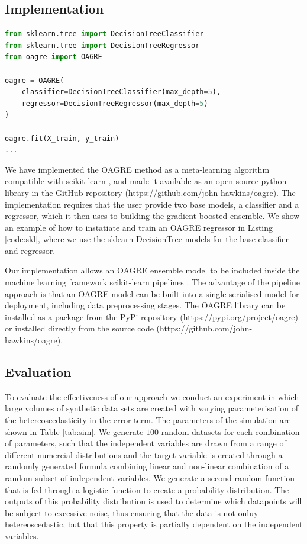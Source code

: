 \documentclass[graybox]{svmult}
\begin{document}
\subsection{Implementation}
 
\begin{lstlisting}[language=Python,label={code:skl}, caption=Usage of OAGRE with scikit-learn models ]
from sklearn.tree import DecisionTreeClassifier
from sklearn.tree import DecisionTreeRegressor
from oagre import OAGRE

oagre = OAGRE(
    classifier=DecisionTreeClassifier(max_depth=5),
    regressor=DecisionTreeRegressor(max_depth=5)
)

oagre.fit(X_train, y_train)
...
\end{lstlisting}

We have implemented the OAGRE method as a meta-learning algorithm compatible with scikit-learn \cite{pedregosa2011scikit},
and made it available as an open source python library in the GitHub repository (https://github.com/john-hawkins/oagre).
The implementation requires that the user provide two base models, a classifier and a regressor, which it then uses to
building the gradient boosted ensemble. We show an example of how to instatiate and train an OAGRE regressor in
Listing \ref{code:skl}, where we use the sklearn DecisionTree models for the base classifier and regressor.

Our implementation allows an OAGRE ensemble model to be included inside the machine learning framework
scikit-learn pipelines \cite{pedregosa2011scikit}. The advantage of the pipeline approach is that an OAGRE model 
can be built into a single serialised model for deployment, including data preprocessing stages.
The OAGRE library can be installed as a package from the PyPi repository (https://pypi.org/project/oagre)
or installed directly from the source code (https://github.com/john-hawkins/oagre).
 
\subsection{Evaluation}

To evaluate the effectiveness of our approach we conduct an experiment in which large volumes of synthetic data
sets are created with varying parameterisation of the hetereoscedasticity in the error term. The parameters of
the simulation are shown in Table \ref{tab:sim}. We generate $100$ random datasets for each combination of 
parameters, such that the independent variables are drawn from a range of different numercial distributions
and the target variable is created through a randomly generated formula combining linear and non-linear 
combination of a random subset of independent variables. We generate a second random function that is fed
through a logistic function to create a probability distribution. The outputs of this probability distribution
is used to determine which datapoints will be subject to excessive noise, thus ensuring that the data is
not onluy hetereoscedastic, but that this property is partially dependent on the independent variables.
\end{document}
